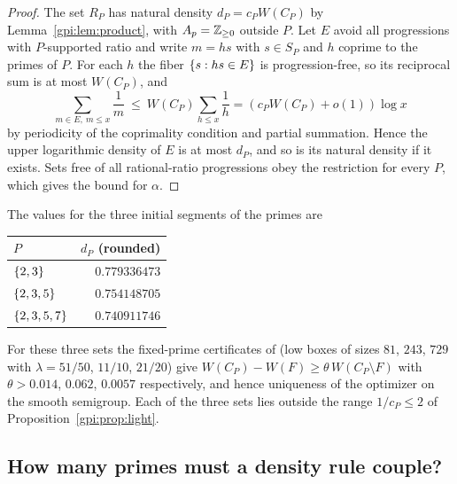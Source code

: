 \begin{proof}
The set $R_P$ has natural density $d_P=c_PW(C_P)$ by Lemma~\ref{gpi:lem:product}, with
$A_p=\mathbb{Z}_{\ge0}$ outside $P$. Let $E$ avoid all progressions with $P$-supported ratio and write
$m=hs$ with $s\in S_P$ and $h$ coprime to the primes of $P$. For each $h$ the fiber
$\{s:hs\in E\}$ is progression-free, so its reciprocal sum is at most $W(C_P)$, and
\[
 \sum_{m\in E,\ m\le x}\frac1m\ \le\ W(C_P)\sum_{h\le x}\frac1h=(c_PW(C_P)+o(1))\log x
\]
by periodicity of the coprimality condition and partial summation. Hence the upper
logarithmic density of $E$ is at most $d_P$, and so is its natural density if it exists.
Sets free of all rational-ratio progressions obey the restriction for every $P$, which gives
the bound for $\alpha$.
\end{proof}

The values for the three initial segments of the primes are
\begin{center}\small
\begin{tabular}{lr}
\toprule
$P$ & $d_P$ (rounded)\\ \midrule
$\{2,3\}$ & $0.779336473$\\
$\{2,3,5\}$ & $0.754148705$\\
$\{2,3,5,7\}$ & $0.740911746$\\ \bottomrule
\end{tabular}
\end{center}
For these three sets the fixed-prime certificates of
(low boxes of sizes $81$,
$243$, $729$ with $\lambda=51/50$, $11/10$, $21/20$) give
$W(C_P)-W(F)\ge\theta\,W(C_P\setminus F)$ with $\theta>0.014$, $0.062$, $0.0057$
respectively, and hence uniqueness of the optimizer on the smooth semigroup. Each of the
three sets lies outside the range $1/c_P\le2$ of Proposition~\ref{gpi:prop:light}.

\subsection{How many primes must a density rule couple?}\label{gpi:sec:blocks}
{\raggedright{}}

